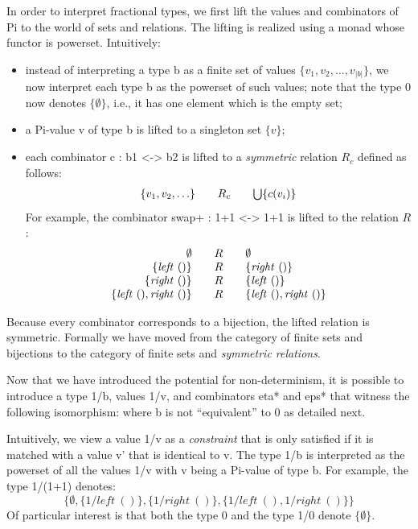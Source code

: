 \documentclass[preprint]{sigplanconf}
\newcommand{\modulusp}[1]{\left | #1 \right |}
\begin{document}
In order to interpret fractional types, we first lift the values and
combinators of {{Pi}} to the world of sets and relations. The lifting is
realized using a monad whose functor is powerset. Intuitively:
\begin{itemize}
\item instead of interpreting a type {{b}} as a finite set of values $\{ v_1,
  v_2, \ldots, v_{\modulusp{b}}\}$, we now interpret each type {{b}} as the
  powerset of such values; note that the type {{0}} now denotes
  $\{\emptyset\}$, i.e., it has one element which is the empty set;
  \item a {{Pi}}-value {{v}} of type {{b}} is lifted to a singleton set 
  $\{ v \}$;
\item each combinator {{c : b1 <-> b2}} is lifted to a \emph{symmetric}
  relation $R_c$ defined as follows:
\[\begin{array}{r@{\qquad}c@{\qquad}l}
\{ v_1, v_2, \ldots \} &R_c& \bigcup \{ c(v_i) \} 
\end{array}\]
For example, the combinator {{swap+ : 1+1 <-> 1+1}} is lifted to the relation $R$:
\[\begin{array}{r@{\qquad}c@{\qquad}l}
\emptyset &R& \emptyset \\
\{ \mathit{left}~() \} &R& \{ \mathit{right}~() \} \\
\{ \mathit{right}~() \} &R& \{ \mathit{left}~() \} \\
\{ \mathit{left}~(), \mathit{right}~() \} &R& \{ \mathit{left}~(), \mathit{right}~() \} 
\end{array}\]
\end{itemize}
Because every combinator corresponds to a bijection, the lifted relation is
symmetric.  Formally we have moved from the category of finite sets and
bijections to the category of finite sets and \emph{symmetric relations}.

Now that we have introduced the potential for non-determinism, it is possible
to introduce a type {{1/b}}, values {{1/v}}, and combinators {{eta*}} and
{{eps*}} that witness the following isomorphism:
where {{b}} is not ``equivalent'' to {{0}} as detailed next.

Intuitively, we view a value {{1/v}} as a \emph{constraint} that is only
satisfied if it is matched with a value {{v'}} that is identical to
{{v}}. The type {{1/b}} is interpreted as the powerset of all the values
{{1/v}} with {{v}} being a {{Pi}}-value of type {{b}}. For example, the type
{{1/(1+1)}} denotes:
\[
\{ 
\emptyset, 
\{ 1/\mathit{left}~() \}, 
\{ 1/\mathit{right}~() \},
\{ 1/\mathit{left}~(), 1/\mathit{right}~() \} 
\}
\]
Of particular interest is that both the type {{0}} and the type {{1/0}}
denote $\{\emptyset\}$. 
\end{document}
